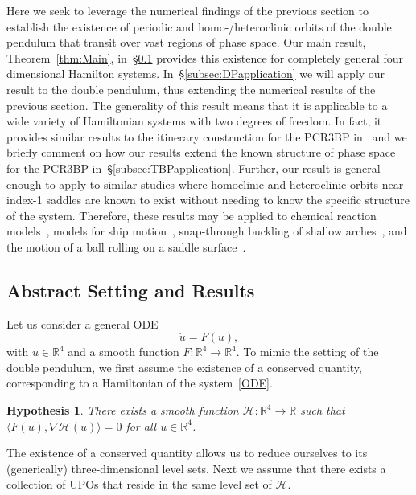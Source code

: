 \documentclass[11pt]{article}
\newcommand{\R}{\mathbb{R}}
\numberwithin{equation}{section}
\theoremstyle{plain}
\newtheorem{hyp}{Hypothesis}
\begin{document}
Here we seek to leverage the numerical findings of the previous section to establish the existence of periodic and homo-/heteroclinic orbits of the double pendulum that transit over vast regions of phase space. Our main result, Theorem~\ref{thm:Main}, in~\S\ref{sec:Theorem} provides this existence for completely general four dimensional Hamilton systems. In~\S\ref{subsec:DPapplication} we will apply our result to the double pendulum, thus extending the numerical results of the previous section. The generality of this result means that it is applicable to a wide variety of Hamiltonian systems with two degrees of freedom. In fact, it provides similar results to the itinerary construction for the PCR3BP in~\cite{Koon} and we briefly comment on how our results extend the known structure of phase space for the PCR3BP in~\S\ref{subsec:TBPapplication}. Further, our result is general enough to apply to similar studies where homoclinic and heteroclinic orbits near index-1 saddles are known to exist without needing to know the specific structure of the system. Therefore, these results may be applied to chemical reaction models~\cite{Chemical,Chemical2,Chemical3}, models for ship motion~\cite{Ship1,Ship2,Naik}, snap-through buckling of shallow arches~\cite{Arch}, and the motion of a ball rolling on a saddle surface~\cite{Ball}.
  


\subsection{Abstract Setting and Results}\label{sec:Theorem}

Let us consider a general ODE 
\begin{equation}\label{ODE}
	\dot{u} = F(u),
\end{equation}
with $u \in \R^4$ and a smooth function $F:\R^4 \to \R^4$. To mimic the setting of the double pendulum, we first assume the existence of a conserved quantity, corresponding to a Hamiltonian of the system~\eqref{ODE}.

\begin{hyp}\label{hyp:Ham} %
There exists a smooth function $\mathcal{H}:\R^4\to\R$ such that $\langle F(u),\nabla \mathcal{H}(u) \rangle = 0$ for all $u \in \R^4$.
\end{hyp}

The existence of a conserved quantity allows us to reduce ourselves to its (generically) three-dimensional level sets. Next we assume that there exists a collection of UPOs that reside in the same level set of $\mathcal{H}$.
\end{document}
